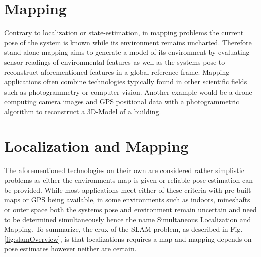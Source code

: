 \section{Mapping}
Contrary to localization or state-estimation, in mapping problems the current pose of the system is known while its environment remains uncharted.
Therefore stand-alone mapping aims to generate a model of its environment by evaluating sensor readings of environmental features as well as the systems pose to reconstruct aforementioned features in a global reference frame. 
Mapping applications often combine technologies typically found in other scientific fields such as photogrammetry or computer vision.
Another example would be a drone computing camera images and GPS positional data with a photogrammetric algorithm to reconstruct a 3D-Model of a building. 


\section{Localization and Mapping}
The aforementioned technologies on their own are considered rather simplistic problems as either the environments map is given or reliable pose-estimation can be provided. While most applications meet either of these criteria with pre-built maps or GPS being available, in some environments such as indoors, mineshafts or outer space both the systems pose and environment remain uncertain and need to be determined simultaneously hence the name Simultaneous Localization and Mapping. 
To summarize, the crux of the SLAM problem, as described in Fig. \ref{fig:slamOverview}, is that localizations requires a map and mapping depends on pose estimates however neither are certain.





